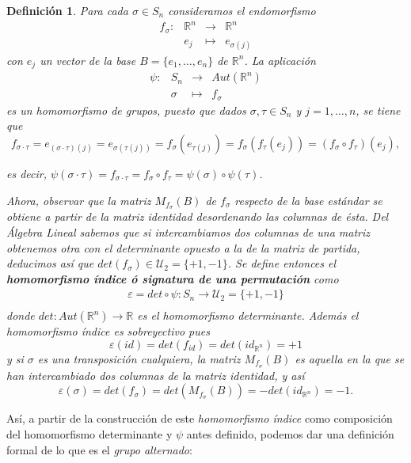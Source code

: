 \documentclass[12pt]{article}
\newtheorem{definition}[theorem]{Definición}
\begin{document}
\begin{definition}Para cada $\sigma \in S_{n}$ consideramos el endomorfismo $$\begin{array}{rccl}
f_{\sigma} \colon &\mathbb{R}^{n}& \longrightarrow &\mathbb{R}^{n}\\
&e_{j}& \longmapsto &e_{\sigma(j)}
\end{array}
$$ con $e_{j}$ un  vector de la base $B = \lbrace e_{1}, \ldots, e_{n} \rbrace$ de $\mathbb{R}^{n}$. La aplicación $$\begin{array}{rccl}
\psi \colon &S_{n}& \longrightarrow &Aut(\mathbb{R}^{n})\\
&\sigma& \longmapsto &f_{\sigma}
\end{array}
$$  es un homomorfismo de grupos, puesto que dados $\sigma, \tau \in S_{n}$ y $j = 1, \ldots, n$, se tiene que $$f_{\sigma \cdot \tau} = e_{(\sigma \cdot \tau)(j)}= e_{\sigma(\tau(j))} = f_{\sigma}(e_{\tau(j)}) = f_{\sigma}(f_{\tau}(e_{j})) = (f_{\sigma} \circ f_{\tau})(e_{j}),$$ 

es decir, $\psi(\sigma \cdot \tau) = f_{\sigma \cdot \tau} = f_{\sigma} \circ f_{\tau} = \psi(\sigma) \circ \psi(\tau)$.

Ahora, observar que la matriz $M_{f_{\sigma}}(B)$ de $f_{\sigma}$ respecto de la base estándar se obtiene a partir de la matriz identidad desordenando las columnas de ésta. Del \textit{Álgebra Lineal} sabemos que si intercambiamos dos columnas de una matriz obtenemos otra con el determinante opuesto a la de la matriz de partida, deducimos así que $det(f_{\sigma}) \in \mathcal{U}_{2} = \lbrace +1, -1 \rbrace$. Se define entonces el  \textbf{homomorfismo índice ó signatura de una permutación} como $$\begin{array}{rccl}
\varepsilon = det \circ \psi \colon S_{n} \longrightarrow \mathcal{U}_{2} = \lbrace +1, -1 \rbrace\\
\end{array}
$$ donde $det \colon Aut(\mathbb{R}^{n}) \longrightarrow \mathbb{R}$ es el homomorfismo determinante. Además el homomorfismo índice es sobreyectivo pues $$\varepsilon(id) = det(f_{id}) = det (id_{\mathbb{R}^{n}}) = +1$$ y si $\sigma$ es una transposición cualquiera, la matriz $M_{f_{\sigma}}(B)$ es aquella en la que se han intercambiado dos columnas de la matriz identidad, y así $$\varepsilon(\sigma) = det(f_{\sigma}) = det(M_{f_{\sigma}}(B)) = -det (id_{\mathbb{R}^{n}}) = -1.$$
\end{definition}

Así, a partir de la construcción de este \textit{homomorfismo índice} como composición del homomorfismo determinante y $\psi$ antes definido, podemos dar una definición formal de lo que es el \textit{grupo alternado}:
\end{document}
